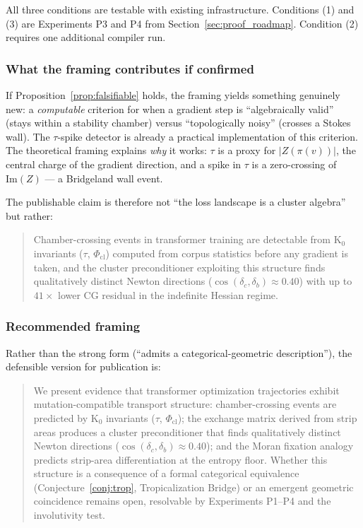 \documentclass[11pt]{amsart}
\begin{document}
All three conditions are testable with existing infrastructure.
Conditions (1) and (3) are Experiments P3 and P4 from
Section~\ref{sec:proof_roadmap}.
Condition (2) requires one additional compiler run.

\subsubsection*{What the framing contributes if confirmed}

If Proposition~\ref{prop:falsifiable} holds, the framing yields
something genuinely new: a \emph{computable} criterion for when a
gradient step is ``algebraically valid'' (stays within a stability
chamber) versus ``topologically noisy'' (crosses a Stokes wall).
The $\tau$-spike detector is already a practical implementation of
this criterion.
The theoretical framing explains \emph{why} it works: $\tau$ is a
proxy for $|Z(\pi(v))|$, the central charge of the gradient direction,
and a spike in $\tau$ is a zero-crossing of $\mathrm{Im}(Z)$ ---
a Bridgeland wall event.

The publishable claim is therefore not ``the loss landscape is a
cluster algebra'' but rather:

\begin{quote}
Chamber-crossing events in transformer training are detectable
from K$_0$ invariants ($\tau$, $\Phi_\mathrm{cl}$) computed from
corpus statistics before any gradient is taken, and the cluster
preconditioner exploiting this structure finds qualitatively distinct
Newton directions ($\cos(\delta_c, \delta_b) \approx 0.40$) with
up to $41\times$ lower CG residual in the indefinite Hessian regime.
\end{quote}

\subsubsection*{Recommended framing}

Rather than the strong form (``admits a categorical-geometric
description''), the defensible version for publication is:

\begin{quote}
We present evidence that transformer optimization trajectories exhibit
mutation-compatible transport structure: chamber-crossing events are
predicted by K$_0$ invariants ($\tau$, $\Phi_\mathrm{cl}$);
the exchange matrix derived from strip areas produces a cluster
preconditioner that finds qualitatively distinct Newton directions
($\cos(\delta_c, \delta_b) \approx 0.40$); and the Moran fixation
analogy predicts strip-area differentiation at the entropy floor.
Whether this structure is a consequence of a formal categorical
equivalence (Conjecture~\ref{conj:trop}, Tropicalization Bridge)
or an emergent geometric coincidence remains open,
resolvable by Experiments P1--P4 and the involutivity test.
\end{quote}
\end{document}
